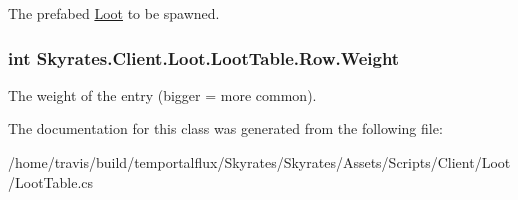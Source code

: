 The prefabed \hyperlink{class_skyrates_1_1_client_1_1_loot_1_1_loot}{Loot} to be spawned. 

\hypertarget{class_skyrates_1_1_client_1_1_loot_1_1_loot_table_1_1_row_a37c7e8af6f77228bbc56ea49295d9c5d}{
\subsubsection[{Weight}]{\setlength{\rightskip}{0pt plus 5cm}int Skyrates.\-Client.\-Loot.\-Loot\-Table.\-Row.\-Weight}}\label{class_skyrates_1_1_client_1_1_loot_1_1_loot_table_1_1_row_a37c7e8af6f77228bbc56ea49295d9c5d}


The weight of the entry (bigger = more common). 



The documentation for this class was generated from the following file\-:\begin{DoxyCompactItemize}
\item 
/home/travis/build/temportalflux/\-Skyrates/\-Skyrates/\-Assets/\-Scripts/\-Client/\-Loot/Loot\-Table.\-cs\end{DoxyCompactItemize}
